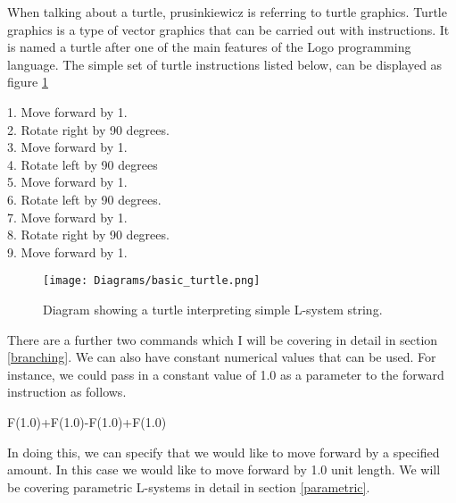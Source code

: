 \begin{flushleft}
When talking about a turtle, prusinkiewicz is referring to turtle graphics. Turtle graphics is a type of vector graphics that can be carried out with instructions. It is named a turtle after one of the main features of the Logo programming language. The simple set of turtle instructions listed below, can be displayed as figure \ref{basic turtle}\\

\vspace{5mm}

1. Move forward by 1.\\
2. Rotate right by 90 degrees.\\
3. Move forward by 1.\\
4. Rotate left by 90 degrees \\
5. Move forward by 1. \\
6. Rotate left by 90 degrees. \\
7. Move forward by 1. \\
8. Rotate right by 90 degrees. \\
9. Move forward by 1.\\

\vspace{5mm}

\begin{figure}[htbp]
	{\centering
		\vspace{7px}
		\texttt{[image: Diagrams/basic\_turtle.png]}
		\caption{Diagram showing a turtle interpreting simple L-system string.} \label{basic turtle}
	}
\end{figure}
\FloatBarrier

\vspace{5mm}

There are a further two commands which I will be covering in detail in section \ref{branching}. We can also have constant numerical values that can be used. For instance, we could pass in a constant value of 1.0 as a parameter to the forward instruction as follows.

\vspace{5mm}

F(1.0)+F(1.0)-F(1.0)+F(1.0)

\vspace{5mm}

In doing this, we can specify that we would like to move forward by a specified amount. In this case we would like to move forward by 1.0 unit length. We will be covering parametric L-systems in detail in section \ref{parametric}.

\end{flushleft}

